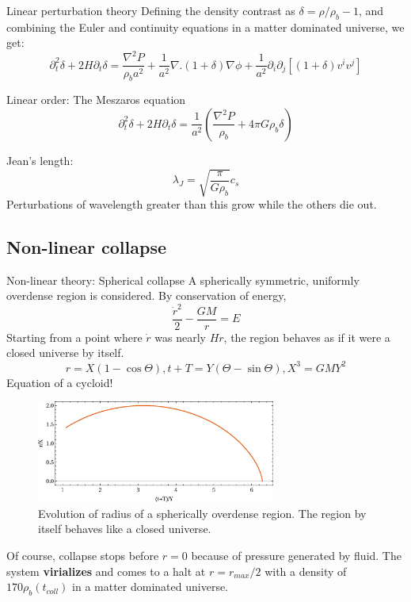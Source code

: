 \documentclass{beamer}
\begin{document}
\begin{frame}{Linear perturbation theory}
	Defining the density contrast as $\delta=\rho/\rho_b-1$, and combining the Euler and continuity equations in a matter dominated universe, we get:
	\begin{equation}
	\partial_t^2\delta+2H\partial_t\delta=\frac{\nabla^2P}{\rho_ba^2}+\frac{1}{a^2}\nabla.(1+\delta)\nabla\phi+\frac{1}{a^2}\partial_i\partial_j[(1+\delta)v^iv^j]
	\label{eq:newt-perturb-exact}
	\end{equation}
	\begin{block}{Linear order: The Meszaros equation}
		\begin{equation}
		\partial_t^2\delta+2H\partial_t\delta=\frac{1}{a^2}(\frac{\nabla^2P}{\rho_b}+4\pi G\rho_b\delta)
		\label{eq:meszaros}
		\end{equation}
	\end{block}
	Jean's length:
	\begin{equation}
	\lambda_J=\sqrt{\frac{\pi}{G\rho_b}}c_s
	\label{ew:JeansLength}
	\end{equation}
	Perturbations of wavelength greater than this grow while the others die out.
\end{frame}
\subsection{Non-linear collapse}
\begin{frame}[allowframebreaks]{Non-linear theory: Spherical collapse}
	A spherically symmetric, uniformly overdense region is considered. By conservation of energy,
	\begin{equation}
	\frac{\dot{r}^2}{2}-\frac{GM}{r}=E
	\label{eq:energy_sphere}
	\end{equation}
	Starting from a point where $\dot{r}$ was nearly $Hr$, the region behaves as if it were a closed universe by itself.
	$$
	r=X(1-\cos\Theta),t+T=Y(\Theta-\sin\Theta),X^3=GMY^2
	$$
	Equation of a cycloid!
	\begin{figure}[h]
		\centering
		\includegraphics[width=0.7\textwidth]{spherical.eps}
		\caption{\footnotesize Evolution of radius of a spherically overdense region. The region by itself behaves like a closed universe.}
		\label{fig:sphere-cycloid}
	\end{figure}
	Of course, collapse stops before $r=0$ because of pressure generated by fluid. The system \textbf{virializes} and comes to a halt at $r=r_{max}/2$ with a density of $170\rho_b(t_{coll})$ in a matter dominated universe. 
\end{frame}
\end{document}
